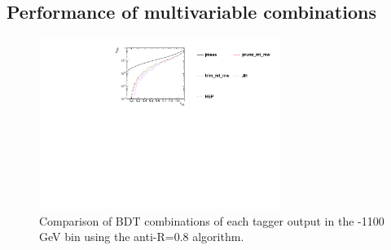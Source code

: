 \subsection{Performance of multivariable combinations}


\begin{figure}
\begin{center}
\includegraphics[width=0.7\textwidth]{./Figures/TTagging/multi_variable/pT.1TeV.R.0.8/Rocs_tagger_groom.pdf}
\caption{Comparison of BDT combinations of each tagger output in the -1100 GeV bin using the anti-\kT R=0.8 algorithm.}
\label{fig:pt1000_taggers_AKt_R08}
\end{center}
\end{figure}


